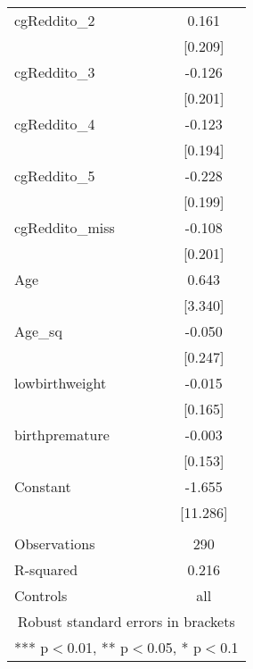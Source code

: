 \documentclass[]{article}
\begin{document}
\begin{tabular}{lc}
cgReddito\_2 & 0.161 \\
 & [0.209] \\
cgReddito\_3 & -0.126 \\
 & [0.201] \\
cgReddito\_4 & -0.123 \\
 & [0.194] \\
cgReddito\_5 & -0.228 \\
 & [0.199] \\
cgReddito\_miss & -0.108 \\
 & [0.201] \\
Age & 0.643 \\
 & [3.340] \\
Age\_sq & -0.050 \\
 & [0.247] \\
lowbirthweight & -0.015 \\
 & [0.165] \\
birthpremature & -0.003 \\
 & [0.153] \\
Constant & -1.655 \\
 & [11.286] \\
 &  \\
Observations & 290 \\
R-squared & 0.216 \\
 Controls & all \\ \hline
\multicolumn{2}{c}{ Robust standard errors in brackets} \\
\multicolumn{2}{c}{ *** p$<$0.01, ** p$<$0.05, * p$<$0.1} \\
\end{tabular}
\end{document}
